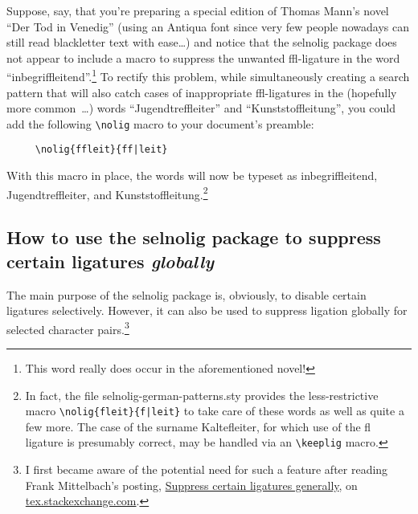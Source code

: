 \documentclass[12pt]{article}
\newcommand{\pkg}[1]{\textsf{#1}}
\newcommand{\cmmd}[1]{\texttt{\textbackslash #1}}
\begin{document}
Suppose, say, that you're preparing a special edition of Thomas Mann's novel \enquote{Der Tod in Venedig} (using an Antiqua font since very few people nowadays can still read {\blackletterfont blackletter} text with ease\dots) and notice that the \pkg{selnolig} package does not appear to include a macro to suppress the unwanted ffl-ligature in the word \enquote{inbegri\mbox{ffl}eitend}.\footnote{This word really does occur in the aforementioned novel!} To rectify this problem, while simultaneously creating a search pattern that will also catch cases of inappropriate ffl-ligatures in the (hopefully more common~\ldots) words  \enquote{Jugendtre\mbox{ffl}eiter} and \enquote{Kunststo\mbox{ffl}eitung}, you could add the following \Verb+\nolig+ macro to your document's preamble:
\begin{Verbatim}
     \nolig{ffleit}{ff|leit}
\end{Verbatim}
With this macro in place, the words will now be typeset as inbegriffleitend, Jugendtreffleiter, and Kunststoffleitung.\footnote{In fact, the file \pkg{selnolig-german-patterns.sty} provides the less-restrictive macro \Verb+\nolig{fleit}{f|leit}+ to take care of these words as well as quite a few more. The case of the surname Kaltefleiter, for which use of the fl ligature is presumably correct, may be handled via an \cmmd{keeplig} macro.}



\subsection[How to use the selnolig package to suppress certain ligatures globally]{How to use the selnolig package to suppress certain ligatures \emph{globally}}
\label{sec:global-nolig}


The main purpose of the \pkg{selnolig} package is, obviously, to disable certain ligatures selectively. However, it can also be used to suppress ligation globally for selected character pairs.\footnote{I first became aware of the potential need for such a feature after reading Frank Mittelbach's posting, \href{http://tex.stackexchange.com/q/61042/5001}{Suppress certain ligatures generally}, on \url{tex.stackexchange.com}.}

\bgroup \ebg
\end{document}
